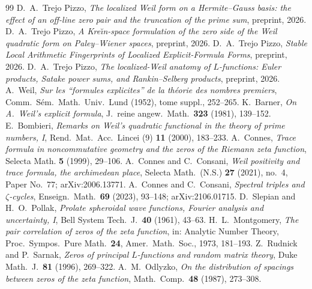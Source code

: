 \documentclass[11pt]{amsart}
\theoremstyle{definition}
\theoremstyle{remark}
\begin{document}
\begin{thebibliography}{99}
 D.~A.~Trejo Pizzo, \emph{The localized Weil form on a Hermite--Gauss basis: the effect of an off-line zero pair and the truncation of the prime sum}, preprint, 2026.
 D.~A.~Trejo Pizzo, \emph{A Kre\u{\i}n-space formulation of the zero side of the Weil quadratic form on Paley--Wiener spaces}, preprint, 2026.
 D.~A.~Trejo Pizzo, \emph{Stable Local Arithmetic Fingerprints of Localized Explicit-Formula Forms}, preprint, 2026.
 D.~A.~Trejo Pizzo, \emph{The localized-Weil anatomy of $L$-functions: Euler products, Satake power sums, and Rankin--Selberg products}, preprint, 2026.
 A.~Weil, \emph{Sur les ``formules explicites'' de la th\'eorie des nombres premiers}, Comm.\ S\'em.\ Math.\ Univ.\ Lund (1952), tome suppl., 252--265.
 K.~Barner, \emph{On A.~Weil's explicit formula}, J.\ reine angew.\ Math.\ \textbf{323} (1981), 139--152.
 E.~Bombieri, \emph{Remarks on Weil's quadratic functional in the theory of prime numbers, I}, Rend.\ Mat.\ Acc.\ Lincei (9) \textbf{11} (2000), 183--233.
 A.~Connes, \emph{Trace formula in noncommutative geometry and the zeros of the Riemann zeta function}, Selecta Math. \textbf{5} (1999), 29--106.
 A.~Connes and C.~Consani, \emph{Weil positivity and trace formula, the archimedean place}, Selecta Math.\ (N.S.) \textbf{27} (2021), no.~4, Paper No.~77; arXiv:2006.13771.
 A.~Connes and C.~Consani, \emph{Spectral triples and $\zeta$-cycles}, Enseign.\ Math.\ \textbf{69} (2023), 93--148; arXiv:2106.01715.
 D.~Slepian and H.~O.~Pollak, \emph{Prolate spheroidal wave functions, Fourier analysis and uncertainty, I}, Bell System Tech.\ J.\ \textbf{40} (1961), 43--63.
 H.~L.~Montgomery, \emph{The pair correlation of zeros of the zeta function}, in: Analytic Number Theory, Proc.\ Sympos.\ Pure Math.\ \textbf{24}, Amer.\ Math.\ Soc., 1973, 181--193.
 Z.~Rudnick and P.~Sarnak, \emph{Zeros of principal $L$-functions and random matrix theory}, Duke Math.\ J.\ \textbf{81} (1996), 269--322.
 A.~M.~Odlyzko, \emph{On the distribution of spacings between zeros of the zeta function}, Math.\ Comp.\ \textbf{48} (1987), 273--308.
\end{thebibliography}
\end{document}
